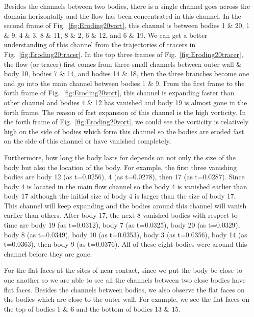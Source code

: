 \documentclass[preprint, 10pt]{elsarticle}
\begin{document}
{Besides the channels between two bodies, there is a single channel 
goes across the domain horizontally and
 the flow has been concentrated in this channel. 
In the second frame of Fig.~\ref{fig:Eroding20vort},
 this channel is between bodies 1 \& 20, 1 \& 9, 4 \& 3, 8 \& 11, 8 \& 2, 6 \& 12, and 6 \& 19. 
We can get a better understanding of this channel from 
the trajectories of tracers in Fig.~\ref{fig:Eroding20tracer}. 
In the top three frames of  Fig.~\ref{fig:Eroding20tracer},
the flow (or tracer) first comes from three small channels 
between outer wall \& body 10, bodies 7 \& 14, and bodies 14 \& 18, 
then the three branches become one and go into the main channel between bodies 1 \& 9. 
From the first frame to the forth frame of Fig.~\ref{fig:Eroding20vort}, 
this channel is expanding faster than other channel 
and bodies 4 \& 12 has vanished and body 19 is almost gone in the forth frame. 
The reason of fast expansion of this channel is the high vorticity. 
In the forth frame of Fig.~\ref{fig:Eroding20vort}, 
we could see the vorticity is relatively high on the side of bodies which form this channel
so the bodies are eroded fast on the side of this channel or have vanished completely.

Furthermore, how long the body lasts for depends on not only the size of the body 
but also the location of the body. 
For example, the first three vanishing bodies are 
body 12 (as t=0.0256), 4 (as t=0.0278), then 17 (as t=0.0287). 
Since body 4 is located in the main flow channel so 
the body 4 is vanished earlier than body 17 
although the initial size of body 4 is larger than the size of body 17.
This channel will keep expanding and the bodies around this channel will vanish earlier than others. 
After body 17, the next 8 vanished bodies with respect to time are body 19 (as t=0.0312),  
 body 7 (as t=0.0325), body 20 (as t=0.0329), body 8 (as t=0.0349), body 10 (as t=0.0353),
 body 3 (as t=0.0356), body 14 (as t=0.0363), then body 9 (as t=0.0376).  
All of these eight bodies were around this channel before they are gone.

For the flat faces at the sites of near contact, since we put the body be close to one another
so we are able to see all the channels between two close bodies have flat faces. 
Besides the channels between bodies, we also observe the flat faces on the bodies 
which are close to the outer wall. For example, we see the flat faces 
on the top of bodies 1 \& 6 and the bottom of bodies 13 \& 15.  

}
\end{document}
